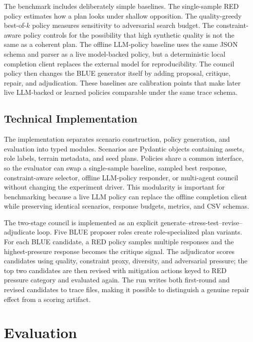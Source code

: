 \documentclass[letterpaper]{article} %
\begin{document}
The benchmark includes deliberately simple baselines. The single-sample RED policy estimates how a plan looks under shallow opposition. The quality-greedy best-of-$k$ policy measures sensitivity to adversarial search budget. The constraint-aware policy controls for the possibility that high synthetic quality is not the same as a coherent plan. The offline LLM-policy baseline uses the same JSON schema and parser as a live model-backed policy, but a deterministic local completion client replaces the external model for reproducibility. The council policy then changes the BLUE generator itself by adding proposal, critique, repair, and adjudication. These baselines are calibration points that make later live LLM-backed or learned policies comparable under the same trace schema.

\subsection{Technical Implementation}

The implementation separates scenario construction, policy generation, and evaluation into typed modules. Scenarios are Pydantic objects containing assets, role labels, terrain metadata, and seed plans. Policies share a common interface, so the evaluator can swap a single-sample baseline, sampled best response, constraint-aware selector, offline LLM-policy responder, or multi-agent council without changing the experiment driver. This modularity is important for benchmarking because a live LLM policy can replace the offline completion client while preserving identical scenarios, response budgets, metrics, and CSV schemas.

The two-stage council is implemented as an explicit generate--stress-test--revise--adjudicate loop. Five BLUE proposer roles create role-specialized plan variants. For each BLUE candidate, a RED policy samples multiple responses and the highest-pressure response becomes the critique signal. The adjudicator scores candidates using quality, constraint proxy, diversity, and adversarial pressure; the top two candidates are then revised with mitigation actions keyed to RED pressure category and evaluated again. The run writes both first-round and revised candidates to trace files, making it possible to distinguish a genuine repair effect from a scoring artifact.

\section{Evaluation}
\end{document}
